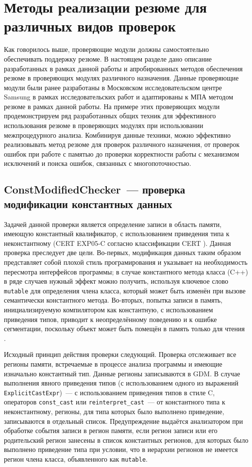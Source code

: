 \section{Методы реализации резюме для различных видов проверок}

Как говорилось выше, проверяющие модули должны самостоятельно обеспечивать поддержку резюме. В настоящем разделе дано описание разработанных в рамках данной работы и апробированных методов обеспечения резюме в проверяющих модулях различного назначения. Данные проверяющие модули были ранее разработаны в Московском исследовательском центре Samsung в рамках исследовательских работ и адаптированы к МПА методом резюме в рамках данной работы. На примере этих проверяющих модули продемонстрируем ряд разработанных общих техник для эффективного использования резюме в проверяющих модулях при использовании межпроцедурного анализа. Комбинируя данные техники, можно эффективно реализовывать метод резюме для проверок различного назначения, от проверок ошибок при работе с памятью до проверки корректности работы с механизмом исключений и поиска ошибок, связанных с многопоточностью.

\subsection{ConstModifiedChecker~--- проверка модификации константных данных}

Задачей данной проверки является определение записи в область памяти, имеющую константный квалификатор, с использованием приведения типа к неконстантному (CERT EXP05-C согласно классификации CERT \cite{cert}). Данная проверка преследует две цели. Во-первых, модификация данных таким образом представляет собой плохой стиль програмирования и указывает на необходимость пересмотра интерфейсов программы; в случае константного метода класса (C++) в ряде случаев нужный эффект можно получить, используя ключевое слово \texttt{mutable} для определения члена класса, который может быть изменён при вызове семантически константного метода. Во-вторых, попытка записи в память, инициализируемую компилятором как константную, с использованием приведения типов, приводит к неопределённому поведению и к ошибке сегментации, поскольку объект может быть помещён в память только для чтения \cite{c-std}.

Исходный принцип действия проверки следующий. Проверка отслеживает все регионы памяти, встречаемые в процессе анализа программы и имеющие изначально константный тип. Данные регионы записываются в GDM. В случае выполнения явного приведения типов (с использованием одного из выражений \texttt{ExplicitCastExpr})~--- с использованием приведения типов в стиле C, операторов \texttt{const\_cast} или \texttt{reinterpret\_cast}~--- от константного типа к неконстантному, регионы, для типа которых было выполнено приведение, записываются в отдельный список. Предупреждение выдаётся анализатором при обработке события записи в регион памяти, если регион записи или его родительский регион занесены в список константных регионов, для которых было выполнено приведение типа при условии, что в иерархии регионов не имеется регион члена класса, объявленного как \texttt{mutable}.

